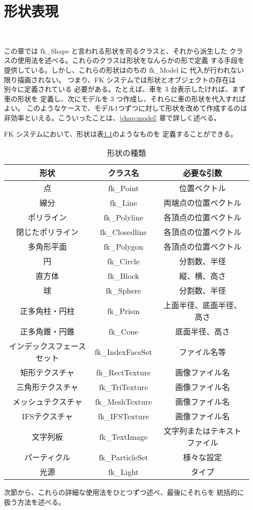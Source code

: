 \chapter{形状表現} \label{chap:shape} ~

この章では fk\_Shape と言われる形状を司るクラスと、それから派生した
クラスの使用法を述べる。これらのクラスは形状をなんらかの形で定義
する手段を提供している。しかし、これらの形状はのちの fk\_Model に
代入が行われない限り描画されない。
つまり、FK システムでは形状とオブジェクトの存在は別々に定義されている
必要がある。たとえば、車を 3 台表示したければ、まず車の形状を
定義し、次にモデルを 3 つ作成し、それらに車の形状を代入すればよい。
このようなケースで、モデル1つずつに対して形状を改めて作成するのは
非効率といえる。こういったことは、\ref{chap:model} 章で詳しく述べる。

FK システムにおいて、形状は表\ref{tbl:fkShape1}のようなものを
定義することができる。

\begin{table}[H]
\caption{形状の種類}
\label{tbl:fkShape1}
\begin{center}
\begin{tabular}{|c|c|c|}
\hline
形状 & クラス名 & 必要な引数 \\ \hline \hline
点 & fk\_Point & 位置ベクトル \\ \hline
線分 & fk\_Line & 両端点の位置ベクトル \\ \hline
ポリライン & fk\_Polyline & 各頂点の位置ベクトル \\ \hline
閉じたポリライン & fk\_Closedline & 各頂点の位置ベクトル \\ \hline
多角形平面 & fk\_Polygon & 各頂点の位置ベクトル \\ \hline
円 & fk\_Circle & 分割数、半径 \\ \hline
直方体 & fk\_Block & 縦、横、高さ \\ \hline
球 & fk\_Sphere & 分割数、半径 \\ \hline
正多角柱・円柱 & fk\_Prism & 上面半径、底面半径、高さ \\ \hline
正多角錐・円錐 & fk\_Cone & 底面半径、高さ \\ \hline
インデックスフェースセット & fk\_IndexFaceSet & ファイル名等 \\ \hline
矩形テクスチャ & fk\_RectTexture & 画像ファイル名 \\ \hline
三角形テクスチャ & fk\_TriTexture & 画像ファイル名 \\ \hline
メッシュテクスチャ & fk\_MeshTexture & 画像ファイル名 \\ \hline
IFSテクスチャ & fk\_IFSTexture & 画像ファイル名 \\ \hline
文字列板 & fk\_TextImage & 文字列またはテキストファイル \\ \hline
パーティクル & fk\_ParticleSet & 様々な設定 \\ \hline
光源 & fk\_Light & タイプ \\ \hline
\end{tabular}
\end{center}
\end{table}
次節から、これらの詳細な使用法をひとつずつ述べ、最後にそれらを
統括的に扱う方法を述べる。
